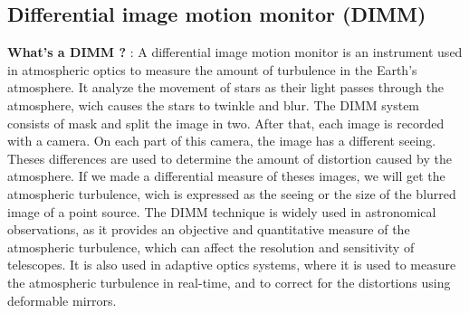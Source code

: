 \subsection{Differential image motion monitor (DIMM)}\label{sec:Theo_DIMM}
\textbf{What's a DIMM ?} : \newline A differential image motion monitor is an instrument used in atmospheric optics to measure the amount of turbulence
in the Earth's atmosphere. It analyze the movement of stars as their light passes through the atmosphere, wich causes the stars to twinkle and blur.
\newline
The DIMM system consists of mask and split the image in two. After that, each image is recorded with a camera. On each part of this camera, the image
has a different seeing. Theses differences are used to determine the amount of distortion caused by the atmosphere.\newline
If we made a differential measure of theses images, we will get the atmospheric turbulence, wich is expressed as the seeing or the size of the
blurred image of a point source. \newline
The DIMM technique is widely used in astronomical observations, as it provides an objective and quantitative measure of the atmospheric turbulence,
which can affect the resolution and sensitivity of telescopes. It is also used in adaptive optics systems, where it is used to measure the atmospheric
turbulence in real-time, and to correct for the distortions using deformable mirrors.

